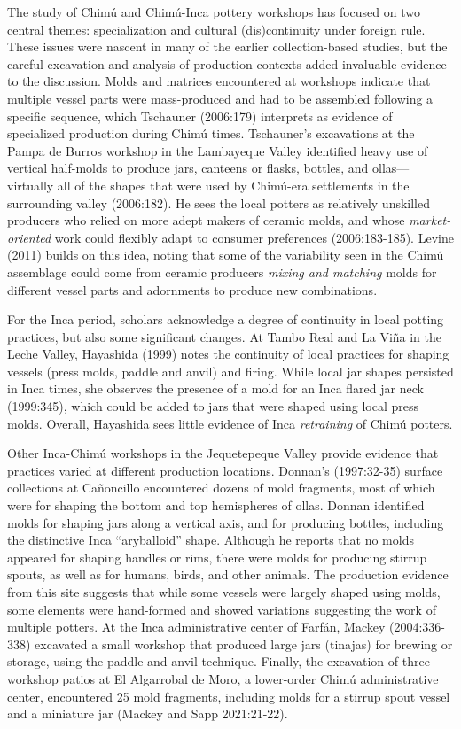 \documentclass[]{interact}
\theoremstyle{plain}%
\theoremstyle{definition}
\theoremstyle{remark}
\begin{document}
The study of Chimú and Chimú-Inca pottery workshops has focused on two
central themes: specialization and cultural (dis)continuity under
foreign rule. These issues were nascent in many of the earlier
collection-based studies, but the careful excavation and analysis of
production contexts added invaluable evidence to the discussion. Molds
and matrices encountered at workshops indicate that multiple vessel
parts were mass-produced and had to be assembled following a specific
sequence, which Tschauner (2006:179) interprets as evidence of
specialized production during Chimú times. Tschauner's excavations at
the Pampa de Burros workshop in the Lambayeque Valley identified heavy
use of vertical half-molds to produce jars, canteens or flasks, bottles,
and ollas---virtually all of the shapes that were used by Chimú-era
settlements in the surrounding valley (2006:182). He sees the local
potters as relatively unskilled producers who relied on more adept
makers of ceramic molds, and whose \emph{market-oriented} work could
flexibly adapt to consumer preferences (2006:183-185). Levine (2011)
builds on this idea, noting that some of the variability seen in the
Chimú assemblage could come from ceramic producers \emph{mixing and
matching} molds for different vessel parts and adornments to produce new
combinations.

For the Inca period, scholars acknowledge a degree of continuity in
local potting practices, but also some significant changes. At Tambo
Real and La Viña in the Leche Valley, Hayashida (1999) notes the
continuity of local practices for shaping vessels (press molds, paddle
and anvil) and firing. While local jar shapes persisted in Inca times,
she observes the presence of a mold for an Inca flared jar neck
(1999:345), which could be added to jars that were shaped using local
press molds. Overall, Hayashida sees little evidence of Inca
\emph{retraining} of Chimú potters.

Other Inca-Chimú workshops in the Jequetepeque Valley provide evidence
that practices varied at different production locations. Donnan's
(1997:32-35) surface collections at Cañoncillo encountered dozens of
mold fragments, most of which were for shaping the bottom and top
hemispheres of ollas. Donnan identified molds for shaping jars along a
vertical axis, and for producing bottles, including the distinctive Inca
``aryballoid'' shape. Although he reports that no molds appeared for
shaping handles or rims, there were molds for producing stirrup spouts,
as well as for humans, birds, and other animals. The production evidence
from this site suggests that while some vessels were largely shaped
using molds, some elements were hand-formed and showed variations
suggesting the work of multiple potters. At the Inca administrative
center of Farfán, Mackey (2004:336-338) excavated a small workshop that
produced large jars (tinajas) for brewing or storage, using the
paddle-and-anvil technique. Finally, the excavation of three workshop
patios at El Algarrobal de Moro, a lower-order Chimú administrative
center, encountered 25 mold fragments, including molds for a stirrup
spout vessel and a miniature jar (Mackey and Sapp 2021:21-22).
\end{document}
